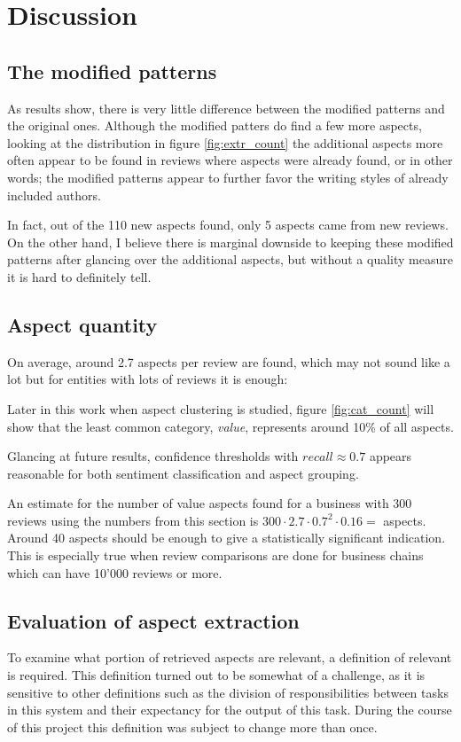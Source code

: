 \documentclass[a4paper,11pt]{kth-mag}
\begin{document}
\section{Discussion}
\subsection{The modified patterns}
As results show, there is very little difference between the modified patterns and
the original ones. Although the modified patters do find a few more aspects, looking
at the distribution in figure \ref{fig:extr_count} the additional aspects more often
appear to be found in reviews where aspects were already found, or in other words;
the modified patterns appear to further favor the writing styles of already included authors.

In fact, out of the 110 new aspects found, only 5 aspects came from new reviews.
On the other hand, I believe there is marginal downside to keeping these modified
patterns after glancing over the additional aspects, but without a quality measure
it is hard to definitely tell. 

\subsection{Aspect quantity}
On average, around 2.7 aspects per review are found, which may not sound like a lot 
but for entities with lots of reviews it is enough:

Later in this work when aspect clustering is studied, figure \ref{fig:cat_count}
will show that the least common category, \emph{value}, represents around
10\% of all aspects.

Glancing at future results, confidence thresholds with $recall\approx 0.7$
appears reasonable for both sentiment classification and aspect grouping.

An estimate for the number of value aspects found for a business with 300 reviews
using the numbers from this section is $300 \cdot 2.7 \cdot 0.7^2 \cdot 0.16 = $ aspects. %
Around 40 aspects should be enough to give a statistically significant indication.
This is especially true when review comparisons are done for
business chains which can have 10'000 reviews or more.

\subsection{Evaluation of aspect extraction}
To examine what portion of retrieved aspects are relevant, a definition of relevant
is required. This definition turned out to be somewhat of a challenge, as it is sensitive
to other definitions such as the division of responsibilities between tasks
in this system and their expectancy for the output of this task.
During the course of this project this definition was subject to change more than once.
\end{document}
